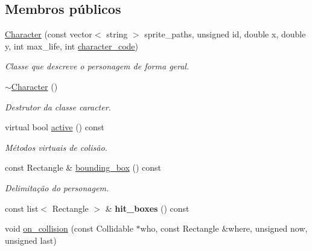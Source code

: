\subsection*{Membros públicos}
\begin{DoxyCompactItemize}
\item 
\mbox{\hyperlink{classCharacter_a442a1c3c8e82823ef340f078c8f4bb50}{Character}} (const vector$<$ string $>$ sprite\+\_\+paths, unsigned id, double x, double y, int max\+\_\+life, int \mbox{\hyperlink{classCharacter_a3e16e9cb23edc78d774cf30925242a8e}{character\+\_\+code}})
\begin{DoxyCompactList}\small\item\em Classe que descreve o personagem de forma geral. \end{DoxyCompactList}\item 
\mbox{\label{classCharacter_a9e9be564d05ded80962b2045aa70b3fc}} 
\mbox{\hyperlink{classCharacter_a9e9be564d05ded80962b2045aa70b3fc}{$\sim$\+Character}} ()
\begin{DoxyCompactList}\small\item\em Destrutor da classe caracter. \end{DoxyCompactList}\item 
virtual bool \mbox{\hyperlink{classCharacter_adbe9684ed82ce4b053881c1a31f2aa97}{active}} () const
\begin{DoxyCompactList}\small\item\em Métodos virtuais de colisão. \end{DoxyCompactList}\item 
\mbox{\label{classCharacter_a73c09996272b771f375a9514d0c465f1}} 
const Rectangle \& \mbox{\hyperlink{classCharacter_a73c09996272b771f375a9514d0c465f1}{bounding\+\_\+box}} () const
\begin{DoxyCompactList}\small\item\em Delimitação do personagem. \end{DoxyCompactList}\item 
\mbox{\label{classCharacter_acb89adb702cac9caca3178066f642443}} 
const list$<$ Rectangle $>$ \& {\bfseries hit\+\_\+boxes} () const
\item 
\mbox{\label{classCharacter_a9559ad61239800e744931814826ae39b}} 
void \mbox{\hyperlink{classCharacter_a9559ad61239800e744931814826ae39b}{on\+\_\+collision}} (const Collidable $\ast$who, const Rectangle \&where, unsigned now, unsigned last)

\end{DoxyCompactItemize}
